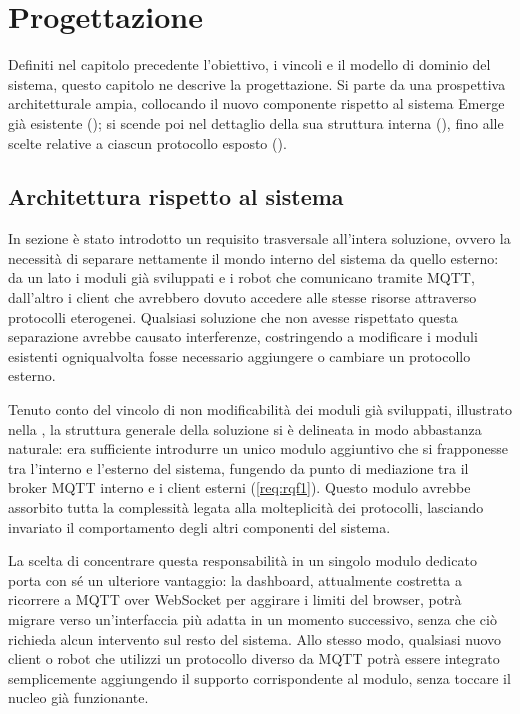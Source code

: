\chapter{Progettazione}
\label{chap:progettazione}
%
Definiti nel capitolo precedente l'obiettivo, i vincoli e il modello di dominio del sistema, questo capitolo ne descrive la progettazione. Si parte da una prospettiva architetturale ampia, collocando il nuovo componente rispetto al sistema Emerge già esistente (); si scende poi nel dettaglio della sua struttura interna (), fino alle scelte relative a ciascun protocollo esposto ().
%
\section{Architettura rispetto al sistema}
\label{sec:architetturale-rispetto-al-sistema}
%
In sezione  è stato introdotto un requisito trasversale all'intera soluzione, ovvero la necessità di separare nettamente il mondo interno del sistema da quello esterno: da un lato i moduli già sviluppati e i robot che comunicano tramite \ac{MQTT}, dall'altro i client che avrebbero dovuto accedere alle stesse risorse attraverso protocolli eterogenei. Qualsiasi soluzione che non avesse rispettato questa separazione avrebbe causato interferenze, costringendo a modificare i moduli esistenti ogniqualvolta fosse necessario aggiungere o cambiare un protocollo esterno.

Tenuto conto del vincolo di non modificabilità dei moduli già sviluppati, illustrato nella , la struttura generale della soluzione si è delineata in modo abbastanza naturale: era sufficiente introdurre un unico modulo aggiuntivo che si frapponesse tra l'interno e l'esterno del sistema, fungendo da punto di mediazione tra il broker \ac{MQTT} interno e i client esterni (\ref{req:rqf1}). Questo modulo avrebbe assorbito tutta la complessità legata alla molteplicità dei protocolli, lasciando invariato il comportamento degli altri componenti del sistema.

La scelta di concentrare questa responsabilità in un singolo modulo dedicato porta con sé un ulteriore vantaggio: la dashboard, attualmente costretta a ricorrere a \ac{MQTT} over WebSocket per aggirare i limiti del browser, potrà migrare verso un'interfaccia più adatta in un momento successivo, senza che ciò richieda alcun intervento sul resto del sistema. Allo stesso modo, qualsiasi nuovo client o robot che utilizzi un protocollo diverso da \ac{MQTT} potrà essere integrato semplicemente aggiungendo il supporto corrispondente al modulo, senza toccare il nucleo già funzionante.

